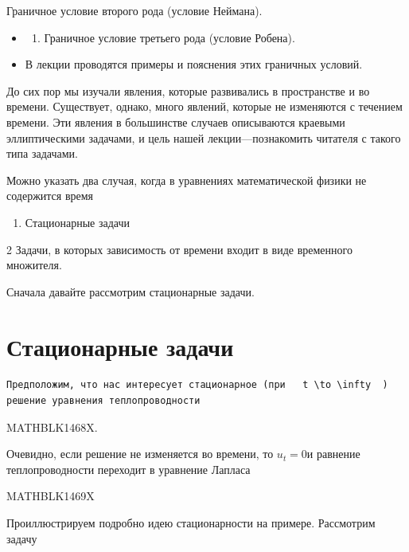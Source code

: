 \documentclass[
]{article}
\providecommand{\tightlist}{%
  \setlength{\itemsep}{0pt}\setlength{\parskip}{0pt}}
\begin{document}
{{{Граничное условие второго рода (условие Неймана).

\begin{itemize}
\tightlist
\item
  \begin{enumerate}
  \def\labelenumi{\arabic{enumi}.}
  \setcounter{enumi}{2}
  \tightlist
  \item
    Граничное условие третьего рода (условие Робена).
  \end{enumerate}
\item
  В лекции проводятся примеры и пояснения этих граничных условий.
\end{itemize}

До сих пор мы изучали явления, которые развивались в пространстве и во
времени. Существует, однако, много явлений, которые не изменяются с
течением времени. Эти явления в большинстве случаев описываются краевыми
эллиптическими задачами, и цель нашей лекции---познакомить читателя с
такого типа задачами.

Можно указать два случая, когда в уравнениях математической физики не
содержится время

\begin{enumerate}
\def\labelenumi{\arabic{enumi}.}
\tightlist
\item
  Стационарные задачи
\end{enumerate}

2 Задачи, в которых зависимость от времени входит в виде временного
множителя.

Сначала давайте рассмотрим стационарные задачи.

\section{Стационарные
задачи}\label{ux441ux442ux430ux446ux438ux43eux43dux430ux440ux43dux44bux435-ux437ux430ux434ux430ux447ux438}

\begin{verbatim}
Предположим, что нас интересует стационарное (при   t \to \infty  ) решение уравнения теплопроводности
\end{verbatim}

MATHBLK1468X.

Очевидно, если решение не изменяется во времени, то \(u_t = 0\)и
равнение теплопроводности переходит в уравнение Лапласа

MATHBLK1469X

Проиллюстрируем подробно идею стационарности на примере. Рассмотрим
задачу

}}}
\end{document}
